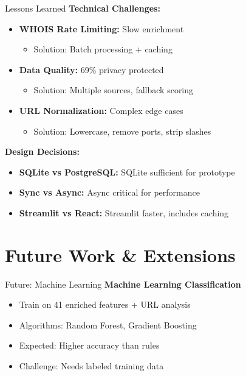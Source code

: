 \documentclass[aspectratio=169]{beamer}
\begin{document}
\begin{frame}{Lessons Learned}
\small
\textbf{Technical Challenges:}
\begin{itemize}
    \item \textbf{WHOIS Rate Limiting:} Slow enrichment
    \begin{itemize}
        \scriptsize
        \item Solution: Batch processing + caching
    \end{itemize}
    \item \textbf{Data Quality:} 69\% privacy protected
    \begin{itemize}
        \scriptsize
        \item Solution: Multiple sources, fallback scoring
    \end{itemize}
    \item \textbf{URL Normalization:} Complex edge cases
    \begin{itemize}
        \scriptsize
        \item Solution: Lowercase, remove ports, strip slashes
    \end{itemize}
\end{itemize}

\vspace{0.3cm}
\textbf{Design Decisions:}
\begin{itemize}
    \scriptsize
    \item \textbf{SQLite vs PostgreSQL:} SQLite sufficient for prototype
    \item \textbf{Sync vs Async:} Async critical for performance
    \item \textbf{Streamlit vs React:} Streamlit faster, includes caching
\end{itemize}
\end{frame}



\section{Future Work \& Extensions}

\begin{frame}{Future: Machine Learning}
\vspace{-0.2cm}
\small
\textbf{Machine Learning Classification}
\begin{itemize}
    \scriptsize
    \setlength\itemsep{-0.1em}
    \item Train on 41 enriched features + URL analysis
    \item Algorithms: Random Forest, Gradient Boosting
    \item Expected: Higher accuracy than rules
    \item Challenge: Needs labeled training data
\end{itemize}
\end{frame}
\end{document}
